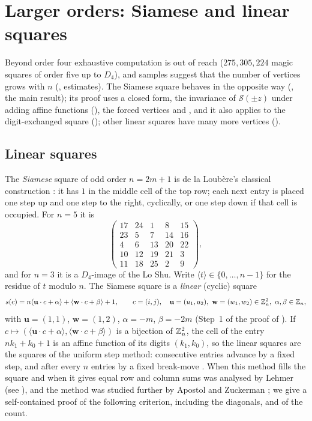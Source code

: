 \section{Larger orders: Siamese and linear squares}
\label{sec:siamese-gems}

Beyond order four exhaustive computation is out of reach ($275{,}305{,}224$ magic squares of order five up to $D_4$), and samples suggest that the number of vertices grows with $n$ (, estimates).
The Siamese square behaves in the opposite way (, the main result); its proof uses a closed form, the invariance of $\mathcal S(\pm z)$ under adding affine functions (), the forced vertices and , and it also applies to the digit-exchanged square (); other linear squares have many more vertices ().

\subsection{Linear squares}

The \emph{Siamese} square of odd order $n=2m+1$ is de la Loub\`ere's classical construction \cite{loubere1693}: it has $1$ in the middle cell of the top row; each next entry is placed one step up and one step to the right, cyclically, or one step down if that cell is occupied.
For $n=5$ it is
\[
\begin{pmatrix}17&24&1&8&15\\23&5&7&14&16\\4&6&13&20&22\\10&12&19&21&3\\11&18&25&2&9\end{pmatrix},
\]
and for $n=3$ it is a $D_4$-image of the Lo Shu.
Write $\langle t\rangle\in\{0,\dots,n-1\}$ for the residue of $t$ modulo $n$.
The Siamese square is a \emph{linear} (cyclic) square
\[
s(c)=n\langle\mathbf u\cdot c+\alpha\rangle+\langle\mathbf w\cdot c+\beta\rangle+1,\qquad c=(i,j),\quad \mathbf u=(u_1,u_2),\ \mathbf w=(w_1,w_2)\in\Z_n^2,\ \alpha,\beta\in\Z_n,
\]
with $\mathbf u=(1,1)$, $\mathbf w=(1,2)$, $\alpha=-m$, $\beta=-2m$ (Step~1 of the proof of ).
If $c\mapsto(\langle\mathbf u\cdot c+\alpha\rangle,\langle\mathbf w\cdot c+\beta\rangle)$ is a bijection of $\mathbb{Z}_n^2$, the cell of the entry $nk_1+k_0+1$ is an affine function of its digits $(k_1,k_0)$, so the linear squares are the squares of the uniform step method: consecutive entries advance by a fixed step, and after every $n$ entries by a fixed break-move \cite[Ch.~I]{andrews1960magic}.
When this method fills the square and when it gives equal row and column sums was analysed by Lehmer \cite{lehmer1929} (see \cite{travassos2013}), and the method was studied further by Apostol and Zuckerman \cite{apostol1951}; we give a self-contained proof of the following criterion, including the diagonals, and of the count.

